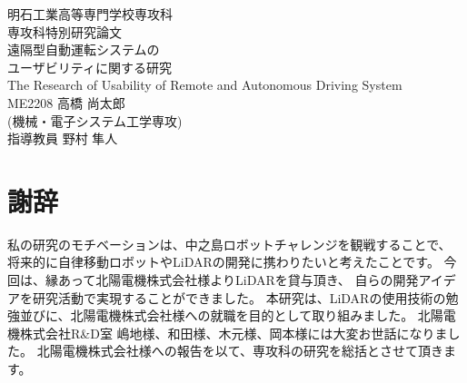 \documentclass[a4paper,12pt]{jreport}
\begin{document}
\vspace*{2cm}
\thispagestyle{empty}
\begin{spacing}{1}
\begin{center}
{\Large 明石工業高等専門学校専攻科 \\[1truecm]
専攻科特別研究論文} \\[3.5truecm]
\huge 遠隔型自動運転システムの \\
\huge ユーザビリティに関する研究 \\
\LARGE The Research of Usability of Remote and Autonomous Driving System\\[4truecm]
\Large ME2208 高橋 尚太郎 \\
(機械・電子システム工学専攻) \\[1truecm]
指導教員 野村 隼人
\end{center}
\tableofcontents
\end{spacing}
\newpage
\clearpage
{}
\pagestyle{fancy}
\setlength{\headheight}{5truemm}










\pagestyle{plain}
\chapter*{謝辞}

私の研究のモチベーションは、中之島ロボットチャレンジを観戦することで、
将来的に自律移動ロボットやLiDARの開発に携わりたいと考えたことです。
今回は、縁あって北陽電機株式会社様よりLiDARを貸与頂き、
自らの開発アイデアを研究活動で実現することができました。
本研究は、LiDARの使用技術の勉強並びに、北陽電機株式会社様への就職を目的として取り組みました。
北陽電機株式会社R\&D室 嶋地様、和田様、木元様、岡本様には大変お世話になりました。
北陽電機株式会社様への報告を以て、専攻科の研究を総括とさせて頂きます。
\end{document}
